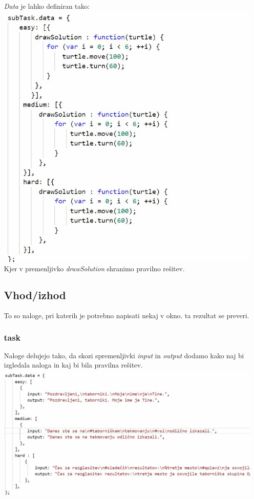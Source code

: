 \documentclass[11pt]{article} %
\begin{document}
\textit{Data} je lahko definiran tako:\\
\includegraphics[scale=0.5]{risanje_task_data} \\

Kjer v premenljivko \textit{drawSolution} shranimo pravilno rešitev.
\subsection{Vhod/izhod}

To so naloge, pri katerih je potrebno napisati nekaj v okno. ta rezultat se preveri.
\subsubsection{task}
 Naloge delujejo tako, da skozi spremenljivki \textit{input} in \textit{output} dodamo kako naj bi izgledala naloga in kaj bi bila pravilna rešitev. \\
\includegraphics[scale=0.6]{task_vhod_data}\\
\end{document}
